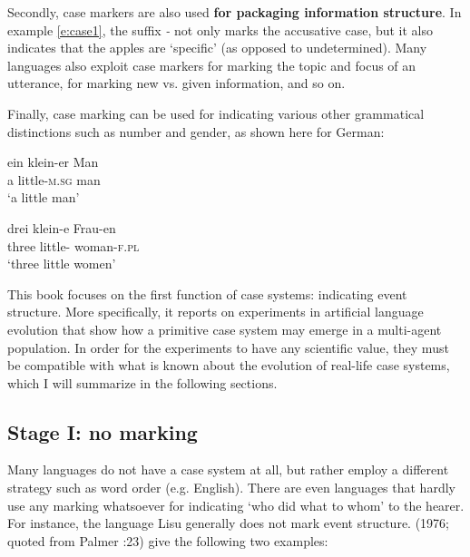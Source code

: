 Secondly, case markers are also used {\bfseries for packaging information structure}. In example \ref{e:case1}, the suffix {\em -\textiota} not only marks the accusative case, but it also indicates that the apples are `specific' (as opposed to undetermined). Many languages also exploit case markers for marking the topic and focus of an utterance, for marking new vs. given information, and so on.

Finally, case marking can be used for indicating various other grammatical distinctions such as number and gender, as shown here for German:

\ea
\gll ein klein-er Man \\
a little-\textsc{m.sg} man \\
\glt `a little man' \\
\z

\ea
\gll drei klein-e Frau-en \\ 
three little-{\pl} woman-\textsc{f.pl} \\
\glt `three little women' \\
\z

This book focuses on the first function of case systems: indicating event structure. More specifically, it reports on experiments in artificial language evolution that show how a primitive case system may emerge in a multi-agent population. In order for the experiments to have any scientific value, they must be compatible with what is known about the evolution of real-life case systems, which I will summarize in the following sections.

\subsection{Stage I: no marking}
\label{s:stage1}

Many languages do not have a case system at all, but rather employ a different strategy such as word order (e.g. English). There are even languages that hardly use any marking whatsoever for indicating `who did what to whom' to the hearer. For instance, the language Lisu generally does not mark event structure. \citeauthor{li76subject} (1976; quoted from Palmer \citeyear{palmer94grammatical}:23) give the following two examples:

\eal
{}
\zl

